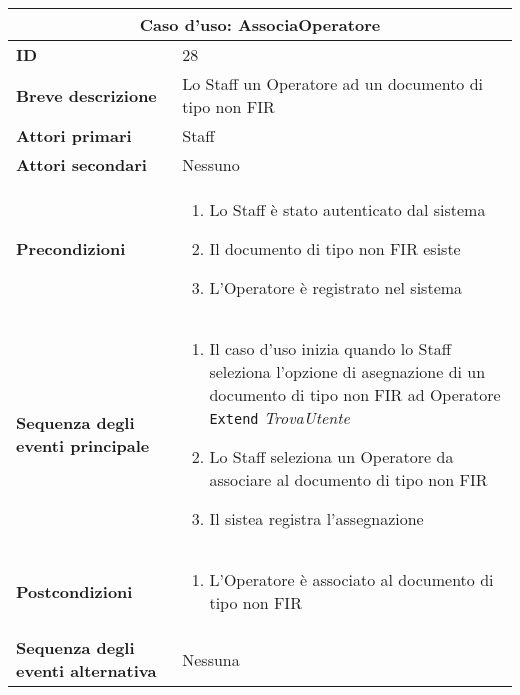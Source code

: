 \documentclass[a4paper]{report}
\begin{document}
\clearpage
\renewcommand{\arraystretch}{1.9}
\begin{table}[H]
\vspace*{-0cm}
\begin{tabular}{|p{3.9cm}|p{9.9cm}|}
\hline
\multicolumn{2}{|c|}{\textbf{Caso d’uso: AssociaOperatore}} \\ \hline
	\textbf{ID} & 28 \\ \hline
	\textbf{Breve descrizione} & Lo Staff un Operatore ad un documento di tipo non FIR \\ \hline
	\textbf{Attori primari} & Staff \\ \hline
	\textbf{Attori secondari} & Nessuno \\ \hline
	\textbf{Precondizioni} & \begin{enumerate}[leftmargin=14pt,label=\arabic*.,labelsep=0.5em,topsep=0pt,partopsep=0pt,parsep=0pt,itemsep=0pt]
        \item Lo Staff è stato autenticato dal sistema
        \item Il documento di tipo non FIR esiste
        \item L'Operatore è registrato nel sistema
    \end{enumerate} \\ \hline
	\textbf{Sequenza degli eventi principale} &
\begin{enumerate}[leftmargin=14pt,label=\arabic*.,labelsep=0.5em,topsep=0pt,partopsep=0pt,parsep=0pt,itemsep=0pt]
    \item Il caso d’uso inizia quando lo Staff seleziona l'opzione di asegnazione di un documento di tipo non FIR ad Operatore
    \newline \texttt{Extend} \textit{TrovaUtente}
    \item Lo Staff seleziona un Operatore da associare al documento di tipo non FIR
    \item Il sistea registra l'assegnazione
\end{enumerate}\\ \hline
	\textbf{Postcondizioni} & \begin{enumerate}[label=\arabic*.,leftmargin=14pt,labelsep=0.5em,topsep=0pt,partopsep=0pt,parsep=0pt,itemsep=0pt]
        \item L'Operatore è associato al documento di tipo non FIR
    \end{enumerate} \\ \hline
	\textbf{Sequenza degli eventi alternativa} & Nessuna \\ \hline
\end{tabular}
\end{table}
\end{document}
